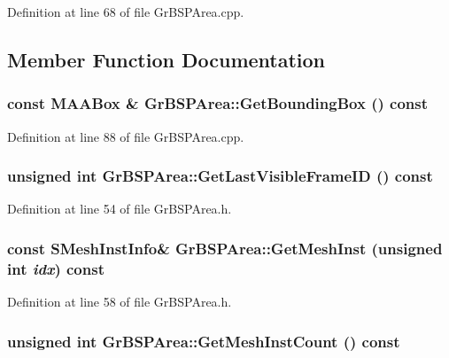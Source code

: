 Definition at line 68 of file GrBSPArea.cpp.

\subsection{Member Function Documentation}
\hypertarget{class_gr_b_s_p_area_7e13e61ee1c244898bbbedb5edfbbdfa}{
\subsubsection[{GetBoundingBox}]{\setlength{\rightskip}{0pt plus 5cm}const {\bf MAABox} \& GrBSPArea::GetBoundingBox () const}}
\label{class_gr_b_s_p_area_7e13e61ee1c244898bbbedb5edfbbdfa}




Definition at line 88 of file GrBSPArea.cpp.\hypertarget{class_gr_b_s_p_area_416ac8fc68f1298b3130e65aa363bfff}{
\subsubsection[{GetLastVisibleFrameID}]{\setlength{\rightskip}{0pt plus 5cm}unsigned int GrBSPArea::GetLastVisibleFrameID () const}}
\label{class_gr_b_s_p_area_416ac8fc68f1298b3130e65aa363bfff}




Definition at line 54 of file GrBSPArea.h.\hypertarget{class_gr_b_s_p_area_3036d2ce15275f657603deb0c553a75e}{
\subsubsection[{GetMeshInst}]{\setlength{\rightskip}{0pt plus 5cm}const {\bf SMeshInstInfo}\& GrBSPArea::GetMeshInst (unsigned int {\em idx}) const}}
\label{class_gr_b_s_p_area_3036d2ce15275f657603deb0c553a75e}




Definition at line 58 of file GrBSPArea.h.\hypertarget{class_gr_b_s_p_area_034cbc677c55de0bd1111aa138d32c0d}{
\subsubsection[{GetMeshInstCount}]{\setlength{\rightskip}{0pt plus 5cm}unsigned int GrBSPArea::GetMeshInstCount () const}}
\label{class_gr_b_s_p_area_034cbc677c55de0bd1111aa138d32c0d}




